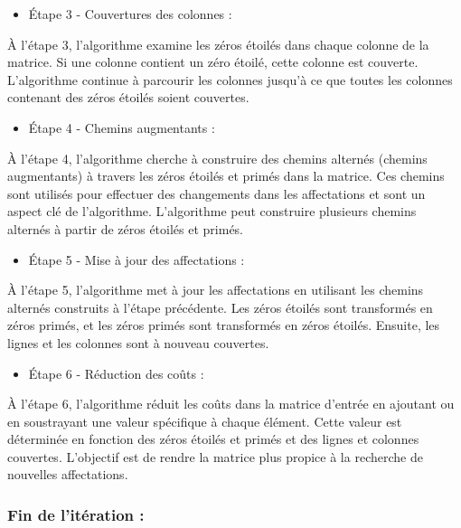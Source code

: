 \documentclass[
]{article}
\providecommand{\tightlist}{%
  \setlength{\itemsep}{0pt}\setlength{\parskip}{0pt}}
\begin{document}
\begin{itemize}
\tightlist
\item
  Étape 3 - Couvertures des colonnes :
\end{itemize}

À l'étape 3, l'algorithme examine les zéros étoilés dans chaque colonne
de la matrice. Si une colonne contient un zéro étoilé, cette colonne est
couverte. L'algorithme continue à parcourir les colonnes jusqu'à ce que
toutes les colonnes contenant des zéros étoilés soient couvertes.

\begin{itemize}
\tightlist
\item
  Étape 4 - Chemins augmentants :
\end{itemize}

À l'étape 4, l'algorithme cherche à construire des chemins alternés
(chemins augmentants) à travers les zéros étoilés et primés dans la
matrice. Ces chemins sont utilisés pour effectuer des changements dans
les affectations et sont un aspect clé de l'algorithme. L'algorithme
peut construire plusieurs chemins alternés à partir de zéros étoilés et
primés.

\begin{itemize}
\tightlist
\item
  Étape 5 - Mise à jour des affectations :
\end{itemize}

À l'étape 5, l'algorithme met à jour les affectations en utilisant les
chemins alternés construits à l'étape précédente. Les zéros étoilés sont
transformés en zéros primés, et les zéros primés sont transformés en
zéros étoilés. Ensuite, les lignes et les colonnes sont à nouveau
couvertes.

\begin{itemize}
\tightlist
\item
  Étape 6 - Réduction des coûts :
\end{itemize}

À l'étape 6, l'algorithme réduit les coûts dans la matrice d'entrée en
ajoutant ou en soustrayant une valeur spécifique à chaque élément. Cette
valeur est déterminée en fonction des zéros étoilés et primés et des
lignes et colonnes couvertes. L'objectif est de rendre la matrice plus
propice à la recherche de nouvelles affectations.

\hypertarget{fin-de-lituxe9ration}{%
\subsubsection{Fin de l'itération :}\label{fin-de-lituxe9ration}}
\end{document}
